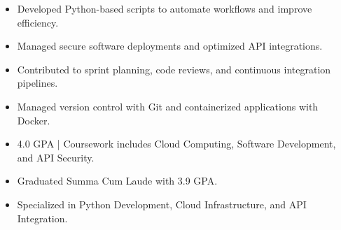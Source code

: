 \par\smallskip
\noindent
\begin{minipage}{20cm}
  \begin{minipage}{9.75cm}
    \begin{itemize}
      \item Developed Python-based scripts to automate workflows and improve efficiency.
      \item Managed secure software deployments and optimized API integrations.
    \end{itemize}
  \end{minipage}
  \hfill
  \begin{minipage}{9.75cm}
    \begin{itemize}
      \item Contributed to sprint planning, code reviews, and continuous integration pipelines.
      \item Managed version control with Git and containerized applications with Docker.
    \end{itemize}
  \end{minipage}
\end{minipage}
\par\smallskip
\divider

\begin{itemize}
  \item 4.0 GPA | Coursework includes Cloud Computing, Software Development, and API Security.
\end{itemize}
\divider

\begin{itemize}
  \item Graduated Summa Cum Laude with 3.9 GPA.
  \item Specialized in Python Development, Cloud Infrastructure, and API Integration.
\end{itemize}

\noindent
\begin{minipage}{20cm}
\end{minipage}


